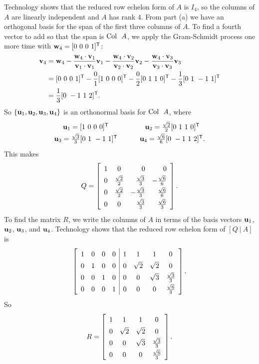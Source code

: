 \begin{example}
\item Technology shows that the reduced row echelon form of $A$ is $I_4$, so the columns of $A$ are linearly independent and $A$ has rank $4$. From part (a) we have an orthogonal basis for the span of the first three columns of $A$. To find a fourth vector to add so that the span is $\text{Col } \ A$, we apply the Gram-Schmidt process one more time with $\vw_4 = [0 \ 0 \ 0 \ 1]^{\tr}$:
\begin{align*}
\mathbf{v}_4 &= \mathbf{w}_4 - \frac{\mathbf{w}_4 \cdot \mathbf{v}_1}{\mathbf{v}_1 \cdot \mathbf{v}_1} \mathbf{v}_1 - \frac{\mathbf{w}_4 \cdot \mathbf{v}_2}{\mathbf{v}_2 \cdot \mathbf{v}_2} \mathbf{v}_2 - \frac{\mathbf{w}_4 \cdot \mathbf{v}_3}{\mathbf{v}_3 \cdot \mathbf{v}_3} \mathbf{v}_3 \\
	&= [0 \ 0 \ 0 \ 1]^{\mathsf{T}} - \frac{0}{1}[1 \ 0 \ 0 \ 0]^{\mathsf{T}} - \frac{0}{2}[0 \ 1 \ 1 \ 0]^{\mathsf{T}} - \frac{1}{3}[0 \ 1 \ -1 \ 1]^{\mathsf{T}}  \\
	&= \frac{1}{3} [0 \ -1 \ 1 \ 2]^{\mathsf{T}}.
\end{align*}
So $\{\mathbf{u}_1, \mathbf{u}_2, \mathbf{u}_3, \mathbf{u}_4\}$ is an orthonormal basis for $\text{Col } \ A$, where
\[\begin{array}{ccc} \vu_1 = [1 \ 0 \ 0 \ 0]^{\tr} &\hspace{12pt} &\vu_2 = \frac{\sqrt{2}}{2}[0 \ 1 \ 1 \ 0]^{\tr} \\ 
  \vu_3 = \frac{\sqrt{3}}{3}[0 \ 1 \ -1 \ 1]^{\tr} &	 &\vu_4 = \frac{\sqrt{6}}{6} [0 \ -1 \ 1 \ 2]^{\tr}.
  \end{array}\]
This makes 
\[Q = \left[ \renewcommand{\arraystretch}{1.4} \begin{array}{ccrr} 1&0&0&0 \\ 0&\frac{\sqrt{2}}{2}&\frac{\sqrt{3}}{3}&-\frac{\sqrt{6}}{6} \\ 0&\frac{\sqrt{2}}{2}&-\frac{\sqrt{3}}{3}&\frac{\sqrt{6}}{6} \\ 0&0&\frac{\sqrt{3}}{3}&\frac{\sqrt{6}}{3} \end{array} \right].\]
To find the matrix $R$, we write the columns of $A$ in terms of the basis vectors $\mathbf{u}_1$, $\mathbf{u}_2$, $\mathbf{u}_3$, and $\mathbf{u}_4$. Technology shows that the reduced row echelon form of $[Q  \ | \ A]$ is 
\[ \left[ \renewcommand{\arraystretch}{1.4}  \begin{array}{cccc|cccc} 1&0&0&0&1&1&1&0 \\ 0&1&0&0&0&\sqrt{2}&\sqrt{2}&0 \\ 0&0&1&0&0&0&\sqrt{3}&\frac{\sqrt{3}}{3} \\ 0&0&0&1&0&0&0&\frac{\sqrt{6}}{3} \end{array} \right].\]
So 
\[R = \left[ \renewcommand{\arraystretch}{1.4} \begin{array}{cccc} 1&1&1&0 \\ 0&\sqrt{2}&\sqrt{2}&0 \\ 0&0&\sqrt{3}&\frac{\sqrt{3}}{3} \\ 0&0&0&\frac{\sqrt{6}}{3} \end{array} \right].\]

\ea 

\end{example}

